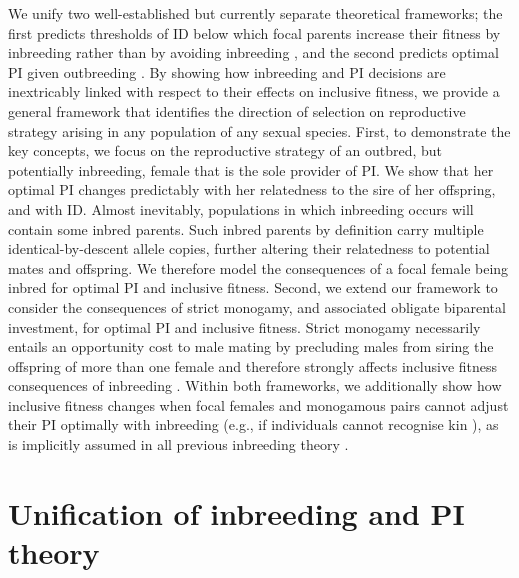 \documentclass[10pt,letterpaper]{article}
\begin{document}
We unify two well-established but currently separate theoretical frameworks; the first predicts thresholds of ID below which focal parents increase their fitness by inbreeding rather than by avoiding inbreeding \cite[][]{Parker1979}, and the second predicts optimal PI given outbreeding \cite[][]{Macnair1978}. By showing how inbreeding and PI decisions are inextricably linked with respect to their effects on inclusive fitness, we provide a general framework that identifies the direction of selection on reproductive strategy arising in any population of any sexual species. First, to demonstrate the key concepts, we focus on the reproductive strategy of an outbred, but potentially inbreeding, female that is the sole provider of PI. We show that her optimal PI changes predictably with her relatedness to the sire of her offspring, and with ID. Almost inevitably, populations in which inbreeding occurs will contain some inbred parents. Such inbred parents by definition carry multiple identical-by-descent allele copies, further altering their relatedness to potential mates and offspring. We therefore model the consequences of a focal female being inbred for optimal PI and inclusive fitness. Second, we extend our framework to consider the consequences of strict monogamy, and associated obligate biparental investment, for optimal PI and inclusive fitness. Strict monogamy necessarily entails an opportunity cost to male mating by precluding males from siring the offspring of more than one female and therefore strongly affects inclusive fitness consequences of inbreeding \cite[][]{Waser1986}. Within both frameworks, we additionally show how inclusive fitness changes when focal females and monogamous pairs cannot adjust their PI optimally with inbreeding (e.g., if individuals cannot recognise kin \cite[][]{Penn2010}), as is implicitly assumed in all previous inbreeding theory \cite[][]{Parker1979, Parker2006, Waser1986, Kokko2006, Duthie2015a}.


\section*{Unification of inbreeding and PI theory}
\end{document}
